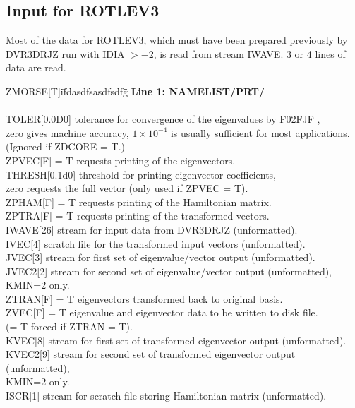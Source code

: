 \documentclass{elsart}
\begin{document}
\subsection{Input for ROTLEV3}

Most of the data for ROTLEV3, which must have been prepared previously by
DVR3DRJZ run with IDIA $> -2$, is read from stream IWAVE. 3 or 4 lines of data
are read. \\
\begin{tabbing}
ZMORSE[T]i\=    fdasdfsasdfsdfg\=   \=             \kill
{\bf Line 1: NAMELIST/PRT/}\\
\\
TOLER[0.0D0] tolerance for convergence of the eigenvalues by F02FJF \cite{NAG},\\
\>  zero gives machine accuracy, $1 \times 10^{-4}$ is usually sufficient
for most applications.\\
\> (Ignored if ZDCORE = T.)\\
ZPVEC[F] \> = T requests printing of the eigenvectors.\\
THRESH[0.1d0] threshold for printing eigenvector coefficients,\\
\> zero requests the full vector (only used if ZPVEC = T).\\
ZPHAM[F] \> = T requests printing of the Hamiltonian matrix.\\
ZPTRA[F] \> = T requests printing of the transformed vectors.\\
IWAVE[26]\> stream for input data from DVR3DRJZ (unformatted).\\
IVEC[4] \> scratch file for the transformed input vectors (unformatted).\\
JVEC[3] \> stream for first set of eigenvalue/vector output
(unformatted).\\
JVEC2[2] \> stream for second set of eigenvalue/vector output
(unformatted), KMIN=2 only.\\
ZTRAN[F] \> = T eigenvectors transformed back to original basis.\\
ZVEC[F] \> = T eigenvalue and eigenvector data to be written to disk file.\\
        \> (= T forced if ZTRAN = T).\\
KVEC[8] \> stream for first set of transformed eigenvector output
(unformatted).\\
KVEC2[9] \> stream for second set of transformed eigenvector output
(unformatted),\\ \> KMIN=2 only.\\
ISCR[1] \> stream for scratch file storing Hamiltonian matrix (unformatted).\\

\end{tabbing}
\end{document}
